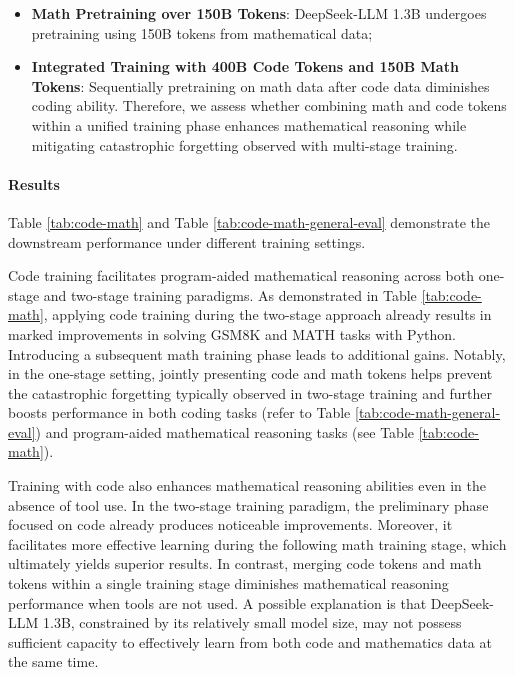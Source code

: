 \begin{itemize}[topsep=0pt]
\begin{itemize}[topsep=0pt]
\begin{itemize}[topsep=0pt]
    \item \textbf{Math Pretraining over 150B Tokens}: DeepSeek-LLM 1.3B undergoes pretraining using 150B tokens from mathematical data;
    \item \textbf{Integrated Training with 400B Code Tokens and 150B Math Tokens}: Sequentially pretraining on math data after code data diminishes coding ability. Therefore, we assess whether combining math and code tokens within a unified training phase enhances mathematical reasoning while mitigating catastrophic forgetting observed with multi-stage training.
\end{itemize}

\paragraph{Results}
Table \ref{tab:code-math} and Table \ref{tab:code-math-general-eval} demonstrate the downstream performance under different training settings.

Code training facilitates program-aided mathematical reasoning across both one-stage and two-stage training paradigms. As demonstrated in Table \ref{tab:code-math}, applying code training during the two-stage approach already results in marked improvements in solving GSM8K and MATH tasks with Python. Introducing a subsequent math training phase leads to additional gains. Notably, in the one-stage setting, jointly presenting code and math tokens helps prevent the catastrophic forgetting typically observed in two-stage training and further boosts performance in both coding tasks (refer to Table \ref{tab:code-math-general-eval}) and program-aided mathematical reasoning tasks (see Table \ref{tab:code-math}).

Training with code also enhances mathematical reasoning abilities even in the absence of tool use. In the two-stage training paradigm, the preliminary phase focused on code already produces noticeable improvements. Moreover, it facilitates more effective learning during the following math training stage, which ultimately yields superior results. In contrast, merging code tokens and math tokens within a single training stage diminishes mathematical reasoning performance when tools are not used. A possible explanation is that DeepSeek-LLM 1.3B, constrained by its relatively small model size, may not possess sufficient capacity to effectively learn from both code and mathematics data at the same time.


\end{itemize}
\end{itemize}
